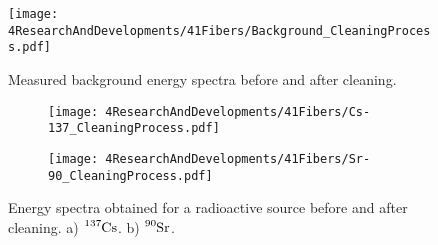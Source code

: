 \begin{figure}[h]
\centering
\texttt{[image: 4ResearchAndDevelopments/41Fibers/Background\_CleaningProcess.pdf]}
\caption{Measured background energy spectra before and after cleaning.\label{fig:ResultsOfCleaningProcessBackground}}
\end{figure}

\begin{figure}
\centering
    \begin{subfigure}[b]{1\textwidth}
    \centering
    \texttt{[image: 4ResearchAndDevelopments/41Fibers/Cs-137\_CleaningProcess.pdf]}  
    \caption{\label{subfig:EnergySpectrumCo60CleaningTest}}
    \end{subfigure}
    \hfill
    \begin{subfigure}[b]{1\textwidth}
    \centering
    \texttt{[image: 4ResearchAndDevelopments/41Fibers/Sr-90\_CleaningProcess.pdf]}  
    \caption{\label{subfig:EnergySpectrumSr90CleaningTest}}
    \end{subfigure}
 \caption{Energy spectra obtained for a radioactive source before and after cleaning. a) $\ce{^{137}Cs}$. b) $\ce{^{90}Sr}$.}
 \label{fig:ResultsOfCleaningProcessSource}
\end{figure}


